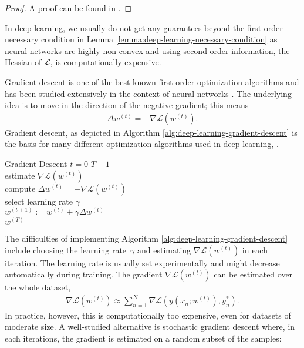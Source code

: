 \begin{proof}
  A proof can be found in \cite[Theorem~2.2]{NocedalWright:2006}.
\end{proof}

In deep learning, we usually do not get any guarantees beyond the first-order
necessary condition in Lemma \ref{lemma:deep-learning-necessary-condition} as
neural networks are highly non-convex and using
second-order information, \ie the Hessian of $\mathcal{L}$, is computationally
expensive.

Gradient descent is one of the best known
first-order optimization algorithms and has been studied extensively
in the context of neural networks \cite{Bottou:2012}.
The underlying idea is to move in the direction of the negative gradient; this means
\begin{align}
  \Delta w^{(t)} = -\nabla \mathcal{L}(w^{(t)}).
\end{align}
Gradient descent, as depicted in Algorithm
\ref{alg:deep-learning-gradient-descent} is the basis for
many different optimization algorithms used in deep learning,
\eg \cite{KingmaBa:2014,Zeiler:2012}.

\begin{algorithm}[t]
	\begin{algo}{Gradient Descent}{
	\small 
	\label{alg:deep-learning-gradient-descent}
	}
		\qfor $t = 0$ \qto $T - 1$\\
			estimate $\nabla \mathcal{L}(w^{(t)})$\\
			compute $\Delta w^{(t)} = - \nabla \mathcal{L}(w^{(t)})$\label{lin:deep-learning-delta-w}\\
			select learning rate $\gamma$\\
			$w^{(t + 1)} := w^{(t)} + \gamma \Delta w^{(t)}$\qrof\\
		\qreturn $w^{(T)}$
	\end{algo}
	\caption[]{The general gradient descent algorithm; different choices of
	the learning rate $\gamma$ and the estimation technique for $\nabla\mathcal{L}(w)$
	may lead to different implementations.}
\end{algorithm}

The difficulties of implementing Algorithm \ref{alg:deep-learning-gradient-descent}
include choosing the learning rate~$\gamma$ and estimating $\nabla \mathcal{L}(w^{(t)})$
in each iteration.
The learning rate is usually set experimentally and might decrease automatically
during training. The gradient $\nabla \mathcal{L}(w^{(t)})$ can be estimated
over the whole dataset, \ie
\begin{align}
  \nabla \mathcal{L}(w^{(t)}) \approx \sum_{n = 1}^N \nabla \mathcal{L}(y(x_n; w^{(t)}), y^*_n).
\end{align}
In practice, however, this is computationally too expensive, even for datasets of
moderate size. A well-studied alternative is stochastic gradient descent
where, in each iterations, the gradient is estimated on a random subset of the samples:

